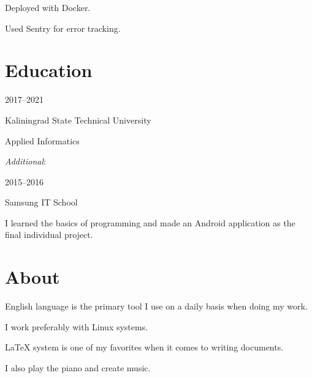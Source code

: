 \documentclass [12pt] {article}
\begin{document}
Deployed with Docker.

Used Sentry for error tracking.

\section {Education}

2017--2021

Kaliningrad State Technical University

Applied Informatics

\bigskip

\emph {Additional}:

2015--2016

Samsung IT School

I learned the basics of programming
and made an Android application as the final individual project.

\section {About}

English language is the primary tool
I use on a daily basis when doing my work.

I work preferably with Linux systems.

LaTeX system is one of my favorites
when it comes to writing documents.

I also play the piano and create music.
\end{document}
